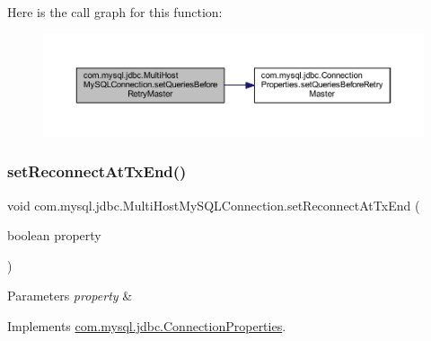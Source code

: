 Here is the call graph for this function\+:
\nopagebreak
\begin{figure}[H]
\begin{center}
\leavevmode
\includegraphics[width=350pt]{classcom_1_1mysql_1_1jdbc_1_1_multi_host_my_s_q_l_connection_abb525c1cf46936e3754abab5a8a83997_cgraph}
\end{center}
\end{figure}
\mbox{\label{classcom_1_1mysql_1_1jdbc_1_1_multi_host_my_s_q_l_connection_aee7c83d3df1213baf1db90fa072c6262}} 
\subsubsection{\texorpdfstring{set\+Reconnect\+At\+Tx\+End()}{setReconnectAtTxEnd()}}
{\footnotesize\ttfamily void com.\+mysql.\+jdbc.\+Multi\+Host\+My\+S\+Q\+L\+Connection.\+set\+Reconnect\+At\+Tx\+End (\begin{DoxyParamCaption}\item[{boolean}]{property }\end{DoxyParamCaption})}


\begin{DoxyParams}{Parameters}
{\em property} & \\
\hline
\end{DoxyParams}


Implements \mbox{\hyperlink{interfacecom_1_1mysql_1_1jdbc_1_1_connection_properties_a60491800609ee12f89f5545a9e26db4c}{com.\+mysql.\+jdbc.\+Connection\+Properties}}.

